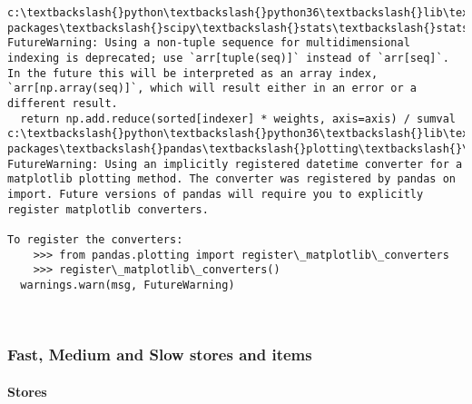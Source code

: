 \documentclass[11pt]{article}
\begin{document}
    \begin{Verbatim}[commandchars=\\\{\}]
c:\textbackslash{}python\textbackslash{}python36\textbackslash{}lib\textbackslash{}site-packages\textbackslash{}scipy\textbackslash{}stats\textbackslash{}stats.py:1706: FutureWarning: Using a non-tuple sequence for multidimensional indexing is deprecated; use `arr[tuple(seq)]` instead of `arr[seq]`. In the future this will be interpreted as an array index, `arr[np.array(seq)]`, which will result either in an error or a different result.
  return np.add.reduce(sorted[indexer] * weights, axis=axis) / sumval
c:\textbackslash{}python\textbackslash{}python36\textbackslash{}lib\textbackslash{}site-packages\textbackslash{}pandas\textbackslash{}plotting\textbackslash{}\_matplotlib\textbackslash{}converter.py:102: FutureWarning: Using an implicitly registered datetime converter for a matplotlib plotting method. The converter was registered by pandas on import. Future versions of pandas will require you to explicitly register matplotlib converters.

To register the converters:
	>>> from pandas.plotting import register\_matplotlib\_converters
	>>> register\_matplotlib\_converters()
  warnings.warn(msg, FutureWarning)

    \end{Verbatim}

    \begin{center}
    \end{center}
    { \hspace*{\fill} \\}
    
    \hypertarget{fast-medium-and-slow-stores-and-items}{%
\subsubsection{Fast, Medium and Slow stores and
items}\label{fast-medium-and-slow-stores-and-items}}

    \hypertarget{stores}{%
\paragraph{Stores}\label{stores}}
\end{document}

